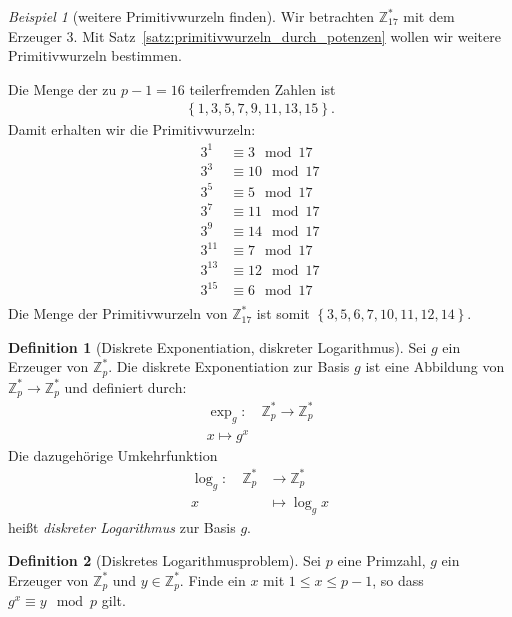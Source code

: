 \documentclass[
  a4paper,
  11pt,
]{scrartcl}
\theoremstyle{plain}
\theoremstyle{definition}
\newtheorem{definition}{Definition}
\theoremstyle{remark}
\newtheorem{beispiel}{Beispiel}
\newcommand{\Z}{\mathbb{Z}}
\begin{document}
\begin{beispiel}[weitere Primitivwurzeln finden]
  Wir betrachten $\Z_{17}^*$ mit dem Erzeuger $3$. Mit
  Satz~\ref{satz:primitivwurzeln_durch_potenzen} wollen wir weitere
  Primitivwurzeln bestimmen.

  Die Menge der zu $p-1 = 16$ teilerfremden Zahlen ist
  \begin{align*}
    \left\{1, 3, 5, 7, 9, 11, 13, 15 \right\}.
  \end{align*}
  Damit erhalten wir die Primitivwurzeln:
  \begin{align*}
    3^1 & \equiv 3 \mod 17\\
    3^3 & \equiv 10 \mod 17\\
    3^5 & \equiv 5 \mod 17\\
    3^7 & \equiv 11 \mod 17\\
    3^9 & \equiv 14 \mod 17\\
    3^{11} & \equiv 7 \mod 17\\
    3^{13} & \equiv 12 \mod 17\\
    3^{15} & \equiv 6 \mod 17\\
  \end{align*}
  Die Menge der Primitivwurzeln von $\Z_{17}^*$ ist somit
  $\left\{ 3, 5, 6, 7, 10, 11, 12, 14 \right\}$.
\end{beispiel}

\begin{definition}[Diskrete Exponentiation, diskreter Logarithmus]
  Sei $g$ ein Erzeuger von $\Z_p^*$. Die diskrete Exponentiation zur Basis $g$
  ist eine Abbildung von $\Z_p^* \to \Z_p^*$ und definiert durch:
  \begin{align*}
    \exp_g: \quad \Z_p^* \to \Z_p^*\\
    x \mapsto g^x
  \end{align*}
  Die dazugehörige Umkehrfunktion
  \begin{align*}
    \log_g: \quad \Z_p^* & \to \Z_p^*\\
    x & \mapsto \log_g x
  \end{align*}
  heißt \emph{diskreter Logarithmus} zur Basis $g$.
\end{definition}

\begin{definition}[Diskretes Logarithmusproblem]\label{def:diskretes_logarithmusproblem}
  Sei $p$ eine Primzahl, $g$ ein Erzeuger von $\Z_p^*$ und $y \in \Z_p^*$.
  Finde ein $x$ mit $1 \leq x \leq p-1$, so dass $g^x \equiv y \mod p$ gilt.
\end{definition}
\end{document}
